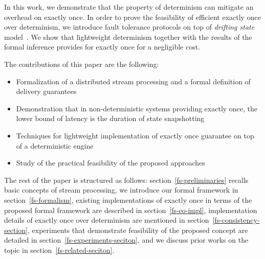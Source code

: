 In this work, we demonstrate that the property of determinism can mitigate an overhead on exactly once. 
In order to prove the feasibility of efficient exactly once over determinism, we introduce  fault tolerance protocols on top of {\em drifting state} model~\cite{we2018adbis}. 
We show that lightweight determinism together with the results of the formal inference provides for  exactly once for a negligible  cost.

The contributions of this paper are the following: 
\begin{itemize}
    \item Formalization of a distributed stream processing  and   a formal   definition of  delivery guarantees 
    \item Demonstration that in non-deterministic systems providing exactly once, the lower bound of latency is the duration of state snapshotting
    \item Techniques for lightweight implementation of exactly once guarantee on top of a deterministic engine
    \item Study of the practical feasibility of the proposed approaches
\end{itemize}

The rest of the paper is structured as follows: 
section~\ref{fs-preliminaries} recalls basic concepts of stream processing, we introduce our formal framework 
in section~\ref{fs-formalism}, existing implementations of exactly once in terms of the proposed formal framework are described 
in section~\ref{fs-eo-impl}, implementation details of exactly once over determinism are mentioned in section~\ref{fs-consistency-section}, experiments that demonstrate feasibility of the proposed concept are detailed in section~\ref{fs-experiments-seciton}, and we discuss prior works on the topic in section~\ref{fs-related-seciton}. 
